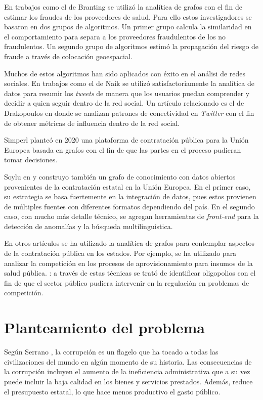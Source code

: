 \documentclass[11pt,letterpaper,oneside]{article}
\begin{document}
En trabajos como el de Branting \cite{Branting-2016} se utilizó la analítica de grafos con el fin de estimar los fraudes de los proveedores de salud. Para ello estos investigadores se basaron en dos grupos de algoritmos. Un primer grupo calcula la similaridad en el comportamiento para separa a los proveedores fraudulentos de los no fraudulentos. Un segundo grupo de algoritmos estimó la propagación del riesgo de fraude a través de colocación geoespacial.

Muchos de estos algoritmos han sido aplicados con éxito en el análisi de redes sociales. En trabajos como el de Naik \cite{Naik-2017} se utilizó satisfactoriamente la analítica de datos para resumir los \textit{tweets} de manera que los usuarios puedan comprender y decidir a quien seguir dentro de la red social. Un artículo relacionado es el de Drakopoulos \cite{Drakopoulos-2017} en donde se analizan patrones de conectividad en \textit{Twitter} con el fin de obtener métricas de influencia dentro de la red social.

Simperl \cite{Simperl-2018} planteó en 2020 una plataforma de contratación pública para la Unión Europea basada en grafos con el fin de que las partes en el proceso pudieran tomar decisiones.

Soylu en \cite{Soylu-2020-1} y \cite{Soylu-2020-2} construyo también un grafo de conocimiento con datos abiertos provenientes de la contratación estatal en la Unión Europea. En el primer caso, su estrategia se basa fuertemente en la integración de datos, pues estos provienen de múltiples fuentes con diferentes formatos dependiendo del país. En el segundo caso, con mucho más detalle técnico, se agregan herramientas de {\em front-end} para la detección de anomalías y la búsqueda multilinguistica.

En otros artículos se ha utilizado la analítica de grafos para contemplar aspectos de la contratación pública en los estados. Por ejemplo, se ha utilizado para analizar la competición en los procesos de aprovisionamiento para insumos de la salud pública. \cite{Fountoukidis-2021}: a través de estas técnicas se trató de identificar oligopolios con el fin de que el sector público pudiera intervenir en la regulación en problemas de competición.

\section{Planteamiento del problema}
Según Serrano \cite{Serrano-2014}, la corrupción es un flagelo que ha tocado a todas las civilizaciones del mundo en algún momento de su historia. Las consecuencias de la corrupción incluyen el aumento de la ineficiencia administrativa que a su vez puede incluir la baja calidad en los bienes y servicios prestados. Además, reduce el presupuesto estatal, lo que hace menos productivo el gasto público.
\end{document}
